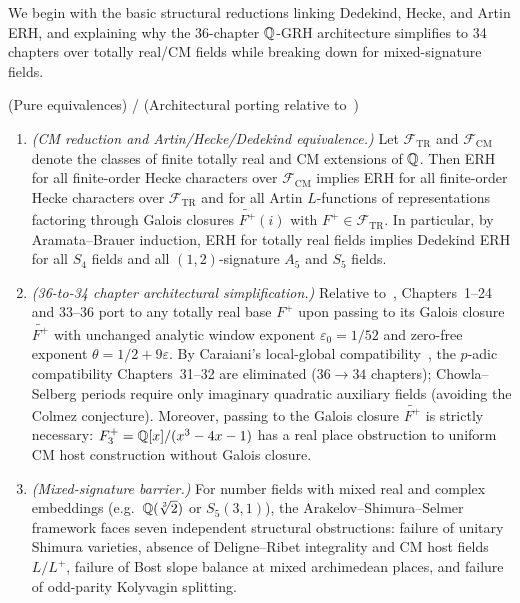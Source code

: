 We begin with the basic structural reductions linking Dedekind, Hecke, and Artin ERH, and explaining why the 36-chapter $\mathbb{Q}$-GRH architecture simplifies to 34 chapters over totally real/CM fields while breaking down for mixed-signature fields.

\begin{proposition}\label{prop:1:port}
\tagProved{} \textup{(Pure equivalences)} / \tagCond{} \textup{(Architectural porting relative to~\cite{Alpoge2026})}
\begin{enumerate}[label=\textup{(\roman*)}]
\item \emph{(CM reduction and Artin/Hecke/Dedekind equivalence.)} Let $\mathcal{F}_{\mathrm{TR}}$ and $\mathcal{F}_{\mathrm{CM}}$ denote the classes of finite totally real and CM extensions of $\mathbb{Q}$. Then ERH for all finite-order Hecke characters over $\mathcal{F}_{\mathrm{CM}}$ implies ERH for all finite-order Hecke characters over $\mathcal{F}_{\mathrm{TR}}$ and for all Artin $L$-functions of representations factoring through Galois closures $\widetilde{F^+}(i)$ with $F^+ \in \mathcal{F}_{\mathrm{TR}}$. In particular, by Aramata--Brauer induction, ERH for totally real fields implies Dedekind ERH for all $S_4$ fields and all $(1,2)$-signature $A_5$ and $S_5$ fields.
\item \emph{(36-to-34 chapter architectural simplification.)} Relative to~\cite{Alpoge2026}, Chapters~1--24 and 33--36 port to any totally real base $F^+$ upon passing to its Galois closure $\widetilde{F^+}$ with unchanged analytic window exponent $\varepsilon_0 = 1/52$ and zero-free exponent $\theta = 1/2 + 9\varepsilon$. By Caraiani's local-global compatibility~\cite{Caraiani2014}, the $p$-adic compatibility Chapters~31--32 are eliminated ($36 \to 34$ chapters); Chowla--Selberg periods require only imaginary quadratic auxiliary fields (avoiding the Colmez conjecture). Moreover, passing to the Galois closure $\widetilde{F^+}$ is strictly necessary: $F_3^+ = \mathbb{Q}[x]/(x^3 - 4x - 1)$ has a real place obstruction to uniform CM host construction without Galois closure.
\item \emph{(Mixed-signature barrier.)} For number fields with mixed real and complex embeddings (e.g.\ $\mathbb{Q}(\sqrt[3]{2})$ or $S_5(3,1)$), the Arakelov--Shimura--Selmer framework faces seven independent structural obstructions: failure of unitary Shimura varieties, absence of Deligne--Ribet integrality and CM host fields $L/L^+$, failure of Bost slope balance at mixed archimedean places, and failure of odd-parity Kolyvagin splitting.
\end{enumerate}
\end{proposition}
